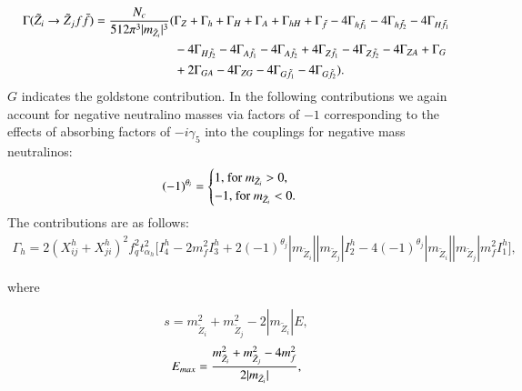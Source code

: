 \documentclass[final,3p,times]{elsarticle}
\begin{document}
\begin{equation} \label{neutneutff}
\begin{aligned}
\Gamma (\tilde{Z}_i \rightarrow \tilde{Z}_j f \bar{f}) = {N_{c} \over 512 \pi^3 |m_{\tilde{Z}_i}|^3}( & \Gamma_Z + \Gamma_h + \Gamma_H + \Gamma_A + \Gamma_{hH} + \Gamma_{\tilde{f}} - 4\Gamma_{h \tilde{f}_1} - 4\Gamma_{h \tilde{f}_2} - 4\Gamma_{H \tilde{f}_1} \\ & - 4\Gamma_{H \tilde{f}_2} - 4\Gamma_{A \tilde{f}_1} - 4\Gamma_{A \tilde{f}_2} + 4\Gamma_{Z \tilde{f}_1} - 4\Gamma_{Z \tilde{f}_2} - 4\Gamma_{ZA} + \Gamma_{G} \\ & + 2\Gamma_{G A} -4\Gamma_{Z G} - 4\Gamma_{G \tilde{f}_1} - 4\Gamma_{G \tilde{f}_2}).
\end{aligned}
\end{equation}
$G$ indicates the goldstone contribution.
In the following contributions we again account for negative neutralino masses via factors of $-1$ corresponding to the effects of absorbing factors of $-i\gamma_5$ into the couplings for negative mass neutralinos:
\begin{equation}
(-1)^{\theta_i} = \begin{cases}
1 $, for $m_{\tilde{Z}_i} > 0, \\
-1 $, for $m_{\tilde{Z}_i} < 0. \\
\end{cases}
\end{equation}
The contributions are as follows:
\begin{equation}
\begin{aligned}
\Gamma_h = 2(X_{ij}^h + X_{ji}^h)^2 f_{q}^2 t_{\alpha_h}^2 \Big[I_{4}^h - 2m_{f}^2 I_{3}^h + 2(-1)^{\theta_j}|m_{\tilde{Z}_i}||m_{\tilde{Z}_j}|I_{2}^h - 4(-1)^{\theta_j}|m_{\tilde{Z}_i}||m_{\tilde{Z}_j}|m_{f}^2 I_{1}^h\Big],
\end{aligned}
\end{equation}

where

\begin{equation}
s = m_{\tilde{Z}_i}^2 + m_{\tilde{Z}_j}^2 - 2|m_{\tilde{Z}_i}|E,
\end{equation}
\begin{equation}
E_{max} = {m_{\tilde{Z}_i}^2 + m_{\tilde{Z}_j}^2 - 4m_{f}^2 \over 2 |m_{\tilde{Z}_i}|},
\end{equation}
\end{document}
